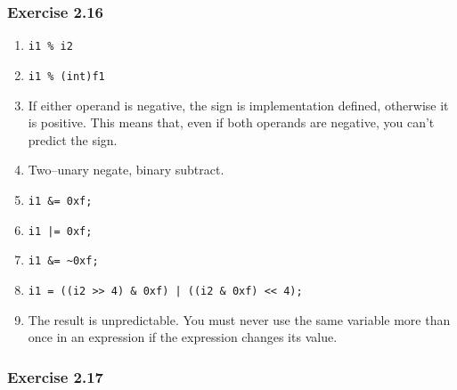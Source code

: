   

  \subsubsection*{Exercise 2.16}

   \begin{enumerate}
    \item \texttt{i1 \% i2}
    \item \texttt{i1 \% (int)f1}

    \item If either operand is negative, the sign is implementation defined,
     otherwise it is positive. This means that, even if both operands are
     negative, you can't predict the sign.

    \item Two--unary negate, binary subtract.

    \item \texttt{i1 \&= 0xf;}
    \item \texttt{i1 |= 0xf;}
    \item \texttt{i1 \&= \~{}0xf;}
    \item \texttt{i1 = ((i2 >{}> 4) \& 0xf) | ((i2 \& 0xf) <{}< 4);}

    \item The result is unpredictable. You must never use the same variable more
     than once in an expression if the expression changes its value.
   \end{enumerate}

  

  \subsubsection*{Exercise 2.17}

